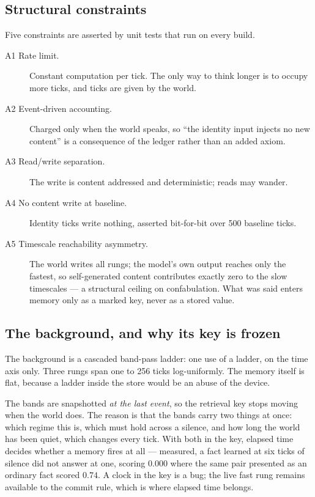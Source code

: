 \documentclass[11pt,a4paper]{article}
\theoremstyle{plain}
\theoremstyle{definition}
\theoremstyle{remark}
\begin{document}
\subsection{Structural constraints}

Five constraints are asserted by unit tests that run on every build.

\begin{description}
\item[A1 Rate limit.] Constant computation per tick. The only way to think
longer is to occupy more ticks, and ticks are given by the world.
\item[A2 Event-driven accounting.] Charged only when the world speaks, so ``the
identity input injects no new content'' is a consequence of the ledger rather
than an added axiom.
\item[A3 Read/write separation.] The write is content addressed and
deterministic; reads may wander.
\item[A4 No content write at baseline.] Identity ticks write nothing, asserted
bit-for-bit over 500 baseline ticks.
\item[A5 Timescale reachability asymmetry.] The world writes all rungs; the
model's own output reaches only the fastest, so self-generated content
contributes exactly zero to the slow timescales --- a structural ceiling on
confabulation. What was said enters memory only as a marked key, never as a
stored value.
\end{description}

\subsection{The background, and why its key is frozen}
\label{sec:background}

The background is a cascaded band-pass ladder: one use of a ladder, on the time
axis only. Three rungs span one to 256 ticks log-uniformly. The memory itself is
flat, because a ladder inside the store would be an abuse of the device.

The bands are snapshotted \emph{at the last event}, so the retrieval key stops
moving when the world does. The reason is that the bands carry two things at
once: which regime this is, which must hold across a silence, and how long the
world has been quiet, which changes every tick. With both in the key, elapsed
time decides whether a memory fires at all --- measured, a fact learned at six
ticks of silence did not answer at one, scoring $0.000$ where the same pair
presented as an ordinary fact scored $0.74$. A clock in the key is a bug; the
live fast rung remains available to the commit rule, which is where elapsed time
belongs.
\end{document}
